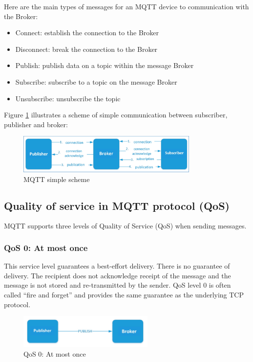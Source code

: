 \documentclass[\main/main.tex]{subfiles}
\begin{document}
Here are the main types of messages for an MQTT device to communication with the Broker:

\begin{itemize}
    \item Connect: establish the connection to the Broker
    \item Disconnect: break the connection to the Broker
    \item Publish: publish data on a topic within the message Broker
    \item Subscribe: subscribe to a topic on the message Broker
    \item Unsubscribe: unsubscribe the topic
\end{itemize}


Figure \ref{fig:mqtt_schema} illustrates a scheme of simple communication between subscriber, publisher and broker: 
\begin{figure}[H]
    \begin{center}
        \includegraphics[width=0.8\textwidth]{mqtt_schema.jpg}
    \end{center}
    \caption{MQTT simple scheme}
    \label{fig:mqtt_schema}
\end{figure}

\subsection{Quality of service in MQTT protocol (QoS)}

MQTT supports three levels of Quality of Service (QoS) when sending messages.

\subsubsection{QoS 0: At most once}
This service level guarantees a best-effort delivery. There is no guarantee of delivery. The recipient does not acknowledge receipt of the message and the message is not stored and re-transmitted by the sender. QoS level 0 is often called “fire and forget” and provides the same guarantee as the underlying TCP protocol.
\begin{figure}[H]
    \begin{center}
        \includegraphics[width=0.6\textwidth]{mqtt_qos_0.jpg}
    \end{center}
    \caption{QoS 0: At most once}
    \label{fig:mqtt_qos_0}
\end{figure}
\end{document}
